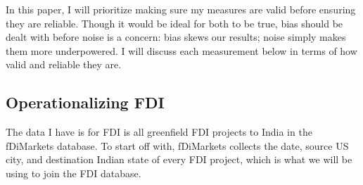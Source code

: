 \documentclass[12pt]{article}
\let\oldsubsection\subsection
\renewcommand{\subsection}{\FloatBarrier\oldsubsection}
\begin{document}
   In this paper, I will prioritize making sure my measures are valid before ensuring they are reliable. Though it would be ideal for both to be true, bias should be dealt with before noise is a concern: bias skews our results; noise simply makes them more underpowered. I will discuss each measurement below in terms of how valid and reliable they are.
   
           
        \subsection{Operationalizing FDI} \label{ss:operationalizing FDI}
    The data I have is for FDI is all greenfield FDI projects to India in the fDiMarkets database. To start off with, fDiMarkets collects the date, source US city, and destination Indian state of every FDI project, which is what we will be using to join the FDI database.
    
\end{document}
